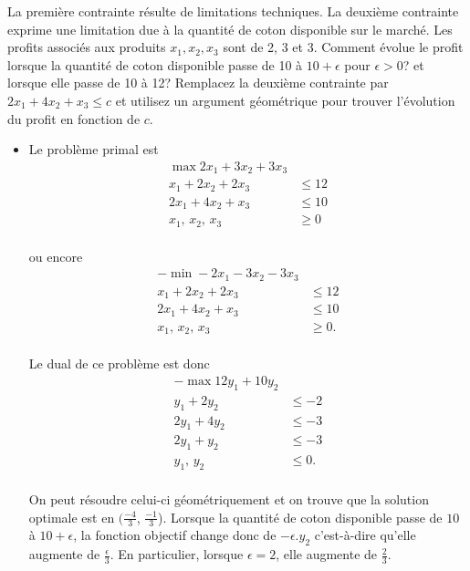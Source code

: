 \begin{enumerate}
    La première contrainte résulte de limitations techniques. La deuxième contrainte exprime une limitation due à la quantité de coton
    disponible sur le marché. Les profits associés aux produits $x_1, x_2, x_3$
    sont de 2, 3 et 3. Comment évolue le profit  lorsque la quantité de coton disponible passe de 10 à $10+ \epsilon$ pour
    $\epsilon >0$? et lorsque elle passe de 10 à 12? Remplacez la deuxième
    contrainte par $2x_1+4x_2 +x_3 \leq c$ et utilisez un argument géométrique pour trouver l'évolution du profit en fonction de $c$.







    \begin{solution}
      \begin{itemize}
      	\item Le problème primal est 
	\begin{align*}
	 \max 2x_1 + 3x_2 + 3x_3\\
            x_1 + 2x_2 + 2x_3& \leq 12\\
           2 x_1 + 4x_2 + x_3 & \leq 10\\
            x_1\text{, }x_2 \text{, }x_3 & \geq 0\\
	\end{align*}
	
	ou encore 
	\begin{align*}
	 - \min -2x_1 - 3x_2 - 3x_3\\
            x_1 + 2x_2 + 2x_3& \leq 12\\
            2x_1 + 4x_2 + x_3 & \leq 10\\
            x_1\text{, }x_2 \text{, }x_3 & \geq 0\text{.}\\
	\end{align*}
	
	Le dual de ce problème est donc
      	\begin{align*}
            - \max 12y_1 + 10y_2\\
            y_1 + 2y_2 & \leq -2\\
            2y_1 + 4y_2 & \leq -3\\
            2y_1 + y_2 & \leq -3\\
            y_1\text{, }y_2 & \leq 0\text{.}\\
          \end{align*}
          
          On peut résoudre celui-ci géométriquement et on trouve que la solution optimale est en $(\frac{-4}{3}$, $\frac{-1}{3}$). Lorsque la quantité de coton disponible passe de $10$ à $10+\epsilon$, la fonction objectif change donc de $-\epsilon\text{.}y_2$ c'est-à-dire qu'elle augmente de $\frac{\epsilon}{3}$. En particulier, lorsque $\epsilon = 2$, elle augmente de $\frac{2}{3}$.
          

\end{itemize}
\end{solution}
\end{enumerate}
